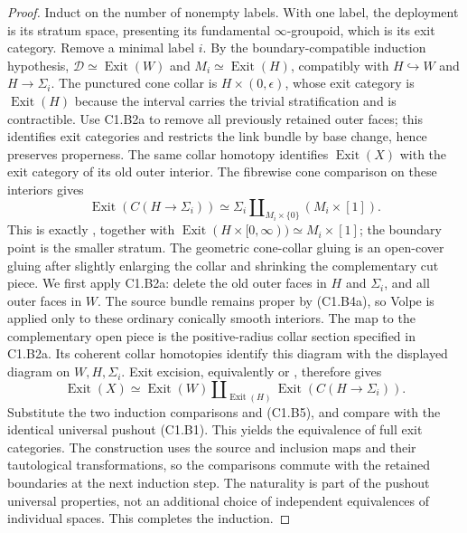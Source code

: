 \begin{proof}
Induct on the number of nonempty labels. With one label, the
deployment is its stratum space, presenting its fundamental
$\infty$-groupoid, which is its exit category. Remove a minimal
label $i$. By the boundary-compatible induction hypothesis,
$\mathcal D\simeq\operatorname{Exit}(W)$ and
$M_i\simeq\operatorname{Exit}(H)$, compatibly with
$H\hookrightarrow W$ and $H\to\Sigma_i$.
The punctured cone collar is $H\times(0,\epsilon)$, whose exit
category is $\operatorname{Exit}(H)$ because the interval carries
the trivial stratification and is contractible. Use C1.B2a to remove all previously retained outer faces;
this identifies exit categories and restricts the link bundle by
base change, hence preserves properness. The same collar homotopy
identifies $\operatorname{Exit}(X)$ with the exit category of its
old outer interior. The fibrewise
cone comparison on these interiors gives
\[
 \operatorname{Exit}(C(H\to\Sigma_i))
 \simeq \Sigma_i\mathbin{\coprod}_{M_i\times\{0\}}
                       (M_i\times[1]).
 \tag{C1.B5}
\]
This is exactly \cite[Lemma 2.13]{C_Volpe}, together with
$\operatorname{Exit}(H\times[0,\infty))\simeq
M_i\times[1]$; the boundary point is the smaller stratum.
The geometric cone-collar gluing is an open-cover gluing after
slightly enlarging the collar and shrinking the complementary
cut piece. We first apply C1.B2a: delete the old outer faces
in $H$ and $\Sigma_i$, and all outer faces in $W$. The source
bundle remains proper by (C1.B4a), so Volpe is applied only to
these ordinary conically smooth interiors. The map to the
complementary open piece is the positive-radius collar section
specified in C1.B2a. Its coherent collar homotopies identify this
diagram with the displayed diagram on $W,H,\Sigma_i$. Exit excision,
equivalently \cite[Corollary 2.17]{C_Volpe} or
\cite[Theorem A.7.1]{LurieHA}, therefore gives
\[
 \operatorname{Exit}(X)\simeq
 \operatorname{Exit}(W)
       \mathbin{\coprod}_{\operatorname{Exit}(H)}
 \operatorname{Exit}(C(H\to\Sigma_i)).
 \tag{C1.B6}
\]
Substitute the two induction comparisons and (C1.B5), and compare
with the identical universal pushout (C1.B1). This yields the
equivalence of full exit categories. The construction uses the
source and inclusion maps and their tautological transformations,
so the comparisons commute with the retained boundaries at the
next induction step. The naturality is part of the pushout
universal properties, not an additional choice of independent
equivalences of individual spaces. This completes the induction.
\end{proof}
